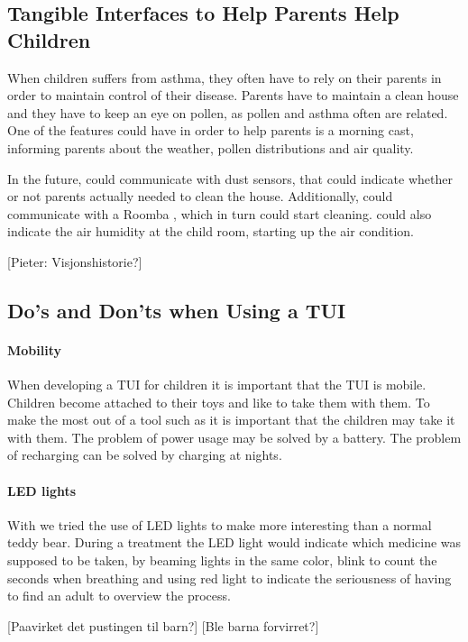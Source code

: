 \subsection{Tangible Interfaces to Help Parents Help Children}
When children suffers from asthma, they often have to rely on their parents in order to maintain control of their disease. Parents have to maintain a clean house and they have to keep an eye on pollen, as pollen and asthma often are related. One of the features \buddy{} could have in order to help parents is a morning cast, informing parents about the weather, pollen distributions and air quality. 

In the future, \buddy{} could communicate with dust sensors, that could indicate whether or not parents actually needed to clean the house. Additionally, \buddy{} could communicate with a Roomba , which in turn could start cleaning. \buddy{} could also indicate the air humidity at the child room, starting up the air condition.   

[Pieter: Visjonshistorie?]

\subsection{Do's and Don'ts when Using a TUI}

\paragraph{Mobility}
When developing a TUI for children it is important that the TUI is mobile. Children become attached to their toys and like to take them with them. To make the most out of a tool such as \buddy{} it is important that the children may take it with them. The problem of power usage may be solved by a battery. The problem of recharging can be solved by charging at nights. 

\paragraph{LED lights}
With \buddy{} we tried the use of LED lights to make \buddy{} more interesting than a normal teddy bear. During a treatment the LED light would indicate which medicine was supposed to be taken, by beaming lights in the same color, blink to count the seconds when breathing and using red light to indicate the seriousness of having to find an adult to overview the process. 

[Paavirket det pustingen til barn?]
[Ble barna forvirret?]

